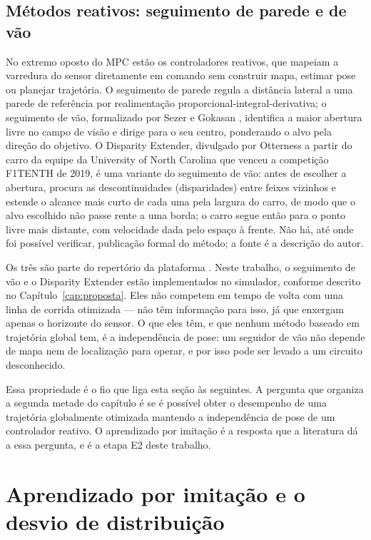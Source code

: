 \subsection{Métodos reativos: seguimento de parede e de vão}

No extremo oposto do MPC estão os controladores reativos, que mapeiam a
varredura do sensor diretamente em comando sem construir mapa, estimar pose ou
planejar trajetória. O seguimento de parede regula a distância lateral a uma
parede de referência por realimentação proporcional-integral-derivativa; o
seguimento de vão, formalizado por Sezer e Gokasan
\cite{Sezer2012FollowGap}, identifica a maior abertura livre no campo de visão e
dirige para o seu centro, ponderando o alvo pela direção do objetivo. O
Disparity Extender, divulgado por Otterness \cite{Otterness2019Disparity} a
partir do carro da equipe da University of North Carolina que venceu a
competição F1TENTH de 2019, é uma variante do seguimento de vão: antes de
escolher a abertura, procura as descontinuidades (disparidades) entre feixes
vizinhos e estende o alcance mais curto de cada uma pela largura do carro, de
modo que o alvo escolhido não passe rente a uma borda; o carro segue então para o
ponto livre mais distante, com velocidade dada pelo espaço à frente. Não há, até
onde foi possível verificar, publicação formal do método; a fonte é a descrição
do autor.

Os três são parte do repertório da plataforma
\cite{Agnihotri2020Teaching, Babu2020Simulator}. Neste trabalho, o seguimento de
vão e o Disparity Extender estão implementados no simulador, conforme descrito
no Capítulo~\ref{cap:proposta}. Eles não competem em
tempo de volta com uma linha de corrida otimizada --- não têm informação para
isso, já que enxergam apenas o horizonte do sensor. O que eles têm, e que
nenhum método baseado em trajetória global tem, é a independência de pose: um
seguidor de vão não depende de mapa nem de localização para operar, e por isso
pode ser levado a um circuito desconhecido.

Essa propriedade é o fio que liga esta seção às seguintes. A pergunta que
organiza a segunda metade do capítulo é se é possível obter o desempenho de uma
trajetória globalmente otimizada mantendo a independência de pose de um
controlador reativo. O aprendizado por imitação é a resposta que a literatura dá
a essa pergunta, e é a etapa E2 deste trabalho.

\section{Aprendizado por imitação e o desvio de distribuição}\label{sec:arte-il}

